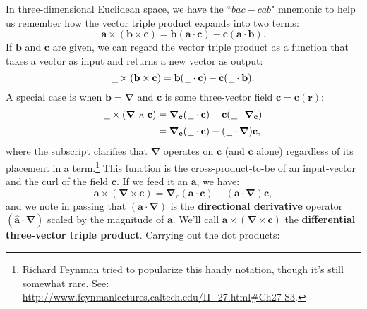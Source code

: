 \documentclass[12pt]{article}
\renewcommand{\vv}[1]{\mathbf{#1}}
\newcommand{\del}{\boldsymbol{\nabla}}
\begin{document}
In three-dimensional Euclidean space, we have the ``$bac - cab$" mnemonic to help us remember how the vector triple product expands into two terms:
\begin{equation*}
\vv a \times (\vv b \times \vv c) = \vv b (\vv a \cdot \vv c) - \vv c (\vv a \cdot \vv b).
\end{equation*}
If $\vv b$ and $\vv c$ are given, we can regard the vector triple product as a function that takes a vector as input and returns a new vector as output:
\begin{equation*}
\text{\underline{\hspace{.6em}}} \times (\vv b \times \vv c) = \vv b ( \mkern1.5mu \text{\underline{\hspace{.6em}}} \cdot \vv c ) - \vv c ( \mkern1.5mu \text{\underline{\hspace{.6em}}} \cdot \vv b ).
\end{equation*}
A special case is when $\vv b = \del$ and $\vv c$ is some three-vector field $\vv c = \vv c (\vv r)$:
\begin{equation}\label{eq:cc}
\begin{split}
\text{\underline{\hspace{.6em}}} \times (\del \times \vv c) &= \del_{\vv c} ( \mkern1.5mu \text{\underline{\hspace{.6em}}} \cdot \vv c ) - \vv c ( \mkern1.5mu \text{\underline{\hspace{.6em}}} \cdot \del_{\vv c} ) \\[2pt]
&= \del_{\vv c} ( \mkern1.5mu \text{\underline{\hspace{.6em}}} \cdot \vv c ) - ( \mkern1.5mu \text{\underline{\hspace{.6em}}} \cdot \del ) \vv c ,
\end{split}
\end{equation}
where the subscript clarifies that $\del$ operates on $\vv c$ (and $\vv c$ alone) regardless of its placement in a term.\footnote{Richard Feynman tried to popularize this handy notation, though it's still somewhat rare. See: \url{http://www.feynmanlectures.caltech.edu/II_27.html\#Ch27-S3}.} This function is the cross-product-to-be of an input-vector and the curl of the field $\vv c$. If we feed it an $\vv a$, we have:
\begin{equation*}
\vv a \times (\del \times \vv c) = \del_{\vv c} ( \vv a \cdot \vv c ) - ( \vv a \cdot \del ) \vv c ,
\end{equation*}
and we note in passing that $(\vv a \cdot \del)$ is the \textbf{directional derivative} operator $(\vv{\hat a} \cdot \del)$ scaled by the magnitude of $\vv a$. We'll call $\vv a \times (\del \times \vv c)$ the \textbf{differential three-vector triple product}. Carrying out the dot products:
\end{document}
